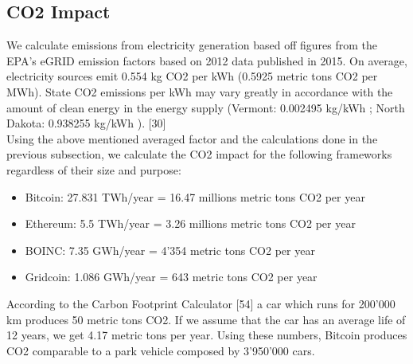 \subsection{CO2 Impact}

We calculate emissions from electricity generation based off figures from the EPA’s eGRID emission factors based on 2012 data published in 2015.  On average, electricity sources emit 0.554 kg CO2 per kWh (0.5925 metric tons CO2 per MWh). State CO2 emissions per kWh may vary greatly in accordance with the amount of clean energy in the energy supply (Vermont: 0.002495 kg/kWh ; North Dakota: 0.938255 kg/kWh ). [30]\\

Using the above mentioned averaged factor and the calculations done in the previous subsection, we calculate the CO2 impact for the following frameworks regardless of their size and purpose:

\begin{itemize}
  \item Bitcoin: 27.831 TWh/year = 16.47 millions metric tons CO2 per year
  \item Ethereum: 5.5 TWh/year = 3.26 millions metric tons CO2 per year
  \item BOINC: 7.35 GWh/year = 4'354 metric tons CO2 per year
  \item Gridcoin: 1.086 GWh/year =  643 metric tons CO2 per year
\end{itemize}

According to the Carbon Footprint Calculator [54] a car which runs for 200'000 km produces 50 metric tons CO2. If we assume that the car has an average life of 12 years, we get 4.17 metric tons per year. Using these numbers, Bitcoin produces CO2 comparable to a park vehicle composed by 3'950'000 cars. 


 